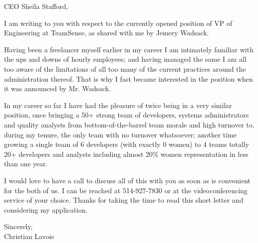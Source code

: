 \documentclass[12pt]{letter} %
\begin{document}

\date{\raggedleft\today} %

\begin{letter}{}

\vspace{1cm} %

\opening{CEO Sheila Stafford,}

I am writing to you with respect to the currently opened position of VP of Engineering at TeamSense, as shared with me by Jemery Wadsack.

Having been a freelancer myself earlier in my career I am intimately familiar with the ups and downs of hourly employees; and having managed the same I am all too aware of the limitations of all too many of the current practices around the administration thereof. That is why I fast became interested in the position when it was announced by Mr. Wadsack.

In my career so far I have had the pleasure of twice being in a very similar position, once bringing a 50+ strong team of developers, systems administrators and quality analysts from bottom-of-the-barrel team morale and high turnover to, during my tenure, the only team with no turnover whatsoever; another time growing a single team of 6 developers (with exactly 0 women) to 4 teams totally 20+ developers and analysts including almost 20\% women representation in less than one year.

I would love to have a call to discuss all of this with you as soon as is convenient for the both of us. I can be reached at 514-927-7830 or at the videoconferencing service of your choice. Thanks for taking the time to read this short letter and considering my application.

Sincerely, \\
Christian Lavoie



\end{letter}
\end{document}
